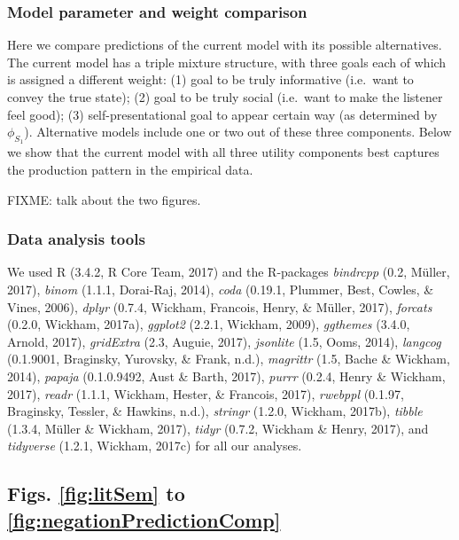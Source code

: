 \documentclass[12pt]{article}
\begin{document}
\subsubsection*{Model parameter and weight comparison}

Here we compare predictions of the current model with its possible
alternatives. The current model has a triple mixture structure, with
three goals each of which is assigned a different weight: (1) goal to be
truly informative (i.e.~want to convey the true state); (2) goal to be
truly social (i.e.~want to make the listener feel good); (3)
self-presentational goal to appear certain way (as determined by
$\phi_{S_1} $). Alternative models include one or two out of these three
components. Below we show that the current model with all three utility components
best captures the production pattern in the empirical data.

FIXME: talk about the two figures.

\subsubsection*{Data analysis tools}

We used R (3.4.2, R Core Team, 2017) and the R-packages \emph{bindrcpp}
(0.2, Müller, 2017), \emph{binom} (1.1.1, Dorai-Raj, 2014), \emph{coda}
(0.19.1, Plummer, Best, Cowles, \& Vines, 2006), \emph{dplyr} (0.7.4,
Wickham, Francois, Henry, \& Müller, 2017), \emph{forcats} (0.2.0,
Wickham, 2017a), \emph{ggplot2} (2.2.1, Wickham, 2009), \emph{ggthemes}
(3.4.0, Arnold, 2017), \emph{gridExtra} (2.3, Auguie, 2017),
\emph{jsonlite} (1.5, Ooms, 2014), \emph{langcog} (0.1.9001, Braginsky,
Yurovsky, \& Frank, n.d.), \emph{magrittr} (1.5, Bache \& Wickham,
2014), \emph{papaja} (0.1.0.9492, Aust \& Barth, 2017), \emph{purrr}
(0.2.4, Henry \& Wickham, 2017), \emph{readr} (1.1.1, Wickham, Hester,
\& Francois, 2017), \emph{rwebppl} (0.1.97, Braginsky, Tessler, \&
Hawkins, n.d.), \emph{stringr} (1.2.0, Wickham, 2017b), \emph{tibble}
(1.3.4, Müller \& Wickham, 2017), \emph{tidyr} (0.7.2, Wickham \& Henry,
2017), and \emph{tidyverse} (1.2.1, Wickham, 2017c) for all our
analyses.


\subsection*{Figs. \ref{fig:litSem} to \ref{fig:negationPredictionComp}}
\end{document}
